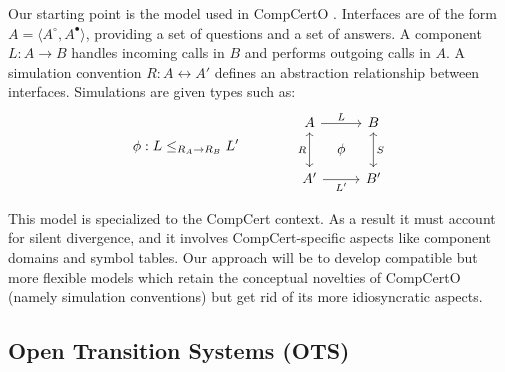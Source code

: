 \documentclass{report}
\begin{document}
Our starting point is the model used in CompCertO \cite{compcerto}.
Interfaces are of the form $A = \langle A^\circ, A^\bullet \rangle$,
providing a set of questions and a set of answers.
A component $L : A \rightarrow B$
handles incoming calls in $B$ and performs outgoing calls in $A$.
A simulation convention $R : A \leftrightarrow A'$
defines an abstraction relationship between interfaces.
Simulations are given types such as:
\[
  \phi : L \le_{R_A \rightarrow R_B} L'
  \qquad \qquad
  \begin{tikzcd}[sep=tiny]
    A \ar[rr, "L"] \ar[dd, leftrightarrow, "R"'] & &
    B \ar[dd, leftrightarrow, "S"] \\
    & \phi & \\
    A' \ar[rr, "L'"'] & & B'
  \end{tikzcd}
\]

This model is specialized to the CompCert context.
As a result
it must account for silent divergence, and
it involves CompCert-specific aspects like
component domains and symbol tables.
Our approach will be to develop compatible but more flexible models
which retain the conceptual novelties of CompCertO
(namely simulation conventions)
but get rid of its more idiosyncratic aspects.


\subsection{Open Transition Systems (OTS)} %
\end{document}
